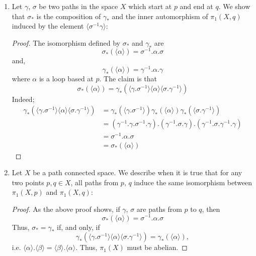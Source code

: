 \documentclass{book}
\newcommand\innerone[1]{\langle #1 \rangle}
\begin{document}
\begin{enumerate}[(1)]
    \item Let $\gamma$, $\sigma$ be two paths in the space $X$ which start at $p$ and end at $q$. We show that $\sigma_*$ is the composition of $\gamma_*$ and the inner automorphism of $\pi_1(X, q)$ induced by the element $\langle \sigma^{-1} \gamma \rangle$: 
        \begin{proof} The isomorphism defined by $\sigma_*$ and $\gamma_*$ are 
            \[\sigma_*(\innerone{\alpha}) = \sigma^{-1}. \alpha. \sigma \]
            and, 
            \[\gamma_*( \innerone{\alpha}) = \gamma^{-1}.\alpha.\gamma\]
            where $\alpha$ is a loop based at $p$. The claim is that 
            \[\sigma_*(\innerone{\alpha}) = \gamma_*( \innerone{\gamma.\sigma^{-1}} \innerone{\alpha} \innerone{\sigma.\gamma^{-1}})\]
            Indeed; 
            \begin{align*}
                \gamma_*( \innerone{\gamma.\sigma^{-1}} \innerone{\alpha} \innerone{\sigma.\gamma^{-1}}) & = \gamma_*( \innerone{\gamma.\sigma^{-1}}) \gamma_*( \innerone{\alpha}) \gamma_*( \innerone{\sigma.\gamma^{-1}}) \\
                & = (\gamma^{-1}.\gamma.\sigma^{-1}.\gamma).(\gamma^{-1}.\sigma. \gamma).(\gamma^{-1}.\sigma.\gamma^{-1}.\gamma) \\
                & = \sigma^{-1}.\alpha.\sigma \\ 
                & = \sigma_*(\innerone{\alpha})
            \end{align*}
        \end{proof}

    \item Let $X$ be a path connected space. We describe when it is true that for any two points $p,q \in X$, all paths from $p$, $q$ induce the same isomorphism between $\pi_1(X, p)$ and $\pi_1(X, q)$: 
        \begin{proof}As the above proof shows, if $\gamma$, $\sigma$ are paths from $p$ to $q$, then
            \[\sigma_*(\innerone{\alpha}) = \sigma^{-1}.\alpha.\sigma\]
            Thus, $\sigma_* = \gamma_*$  if, and only, if 
            \[\gamma_*( \innerone{\gamma.\sigma^{-1}} \innerone{\alpha} \innerone{\sigma.\gamma^{-1}}) = \gamma_*(\innerone{\alpha}),\]
            i.e. $\innerone{\alpha} . \innerone{\beta} = \innerone{\beta} . \innerone{\alpha}$. Thus, $\pi_1(X)$ must be abelian. 
        \end{proof}


\end{enumerate}
\end{document}
